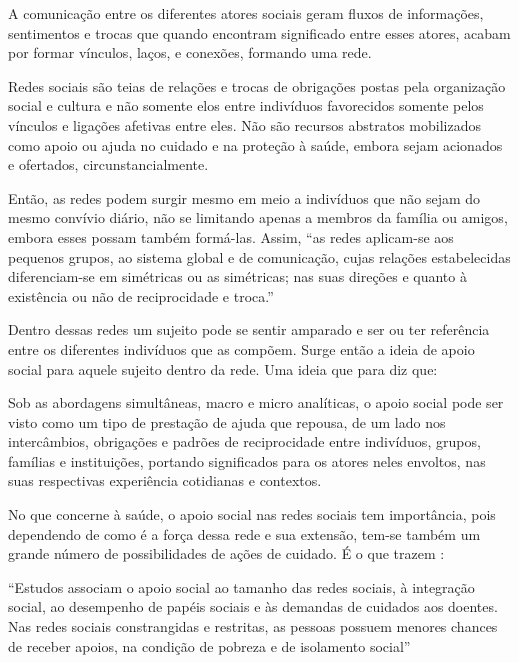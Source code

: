 A comunicação entre os diferentes atores sociais geram fluxos de informações, sentimentos e trocas que quando encontram significado entre esses atores, acabam por formar vínculos, laços, e conexões, formando uma rede.  

\begin{citacao}
Redes sociais são teias de relações e trocas de obrigações postas pela organização social e cultura e não somente elos entre indivíduos favorecidos somente pelos vínculos e ligações afetivas entre eles. Não são recursos abstratos mobilizados como apoio ou ajuda no cuidado e na proteção à saúde, embora sejam acionados e ofertados, circunstancialmente. \cite[p. 1109]{canesqui2012apoio}
\end{citacao}

Então, as redes podem surgir mesmo em meio a indivíduos que não sejam do mesmo convívio diário, não se limitando apenas a membros da família ou amigos, embora esses possam também formá-las. Assim, ``as redes aplicam-se aos pequenos grupos, ao sistema global e de comunicação, cujas relações estabelecidas diferenciam-se em simétricas ou as simétricas; nas suas direções e quanto à existência ou não de reciprocidade e troca.'' \cite{canesqui2012apoio}

Dentro dessas redes um sujeito pode se sentir amparado e ser ou ter referência entre os diferentes indivíduos que as compõem. Surge então a ideia de apoio social para aquele sujeito dentro da rede. Uma ideia que para \cite{canesqui2012apoio} diz que:

\begin{citacao}
Sob as abordagens simultâneas, macro e micro analíticas, o apoio social pode ser visto como um tipo de prestação de ajuda que repousa, de um lado nos intercâmbios, obrigações e padrões de reciprocidade entre indivíduos, grupos, famílias e instituições, portando significados para os atores neles envoltos, nas suas respectivas experiência cotidianas e contextos. \cite[p. 1104]{canesqui2012apoio}
\end{citacao}

No que concerne à saúde, o apoio social nas redes sociais tem importância, pois dependendo de como é a força dessa rede e sua extensão, tem-se também um grande número de possibilidades de ações de cuidado. É o que trazem  \cite{canesqui2012apoio}:

\begin{citacao}
``Estudos associam o apoio social ao tamanho das redes sociais, à integração social, ao desempenho de papéis sociais e às demandas de cuidados aos doentes. Nas redes sociais constrangidas e restritas, as pessoas possuem menores chances de receber apoios, na condição de pobreza e de isolamento social'' \cite[p. 1108]{canesqui2012apoio}
\end{citacao}

